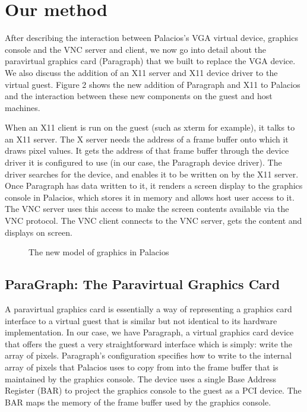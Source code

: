 \documentclass{acm_proc_article-sp}
\begin{document}
\section{Our method}
After describing the interaction between Palacios's VGA virtual device, 
graphics console and the VNC server and client, we now go into detail
about the paravirtual graphics card (Paragraph) that we built to replace the VGA 
device. We also discuss the addition of an X11 server and X11 device driver to
the virtual guest. Figure 2 shows the new addition of Paragraph and X11 to
Palacios and the interaction between these new components on the guest and host
machines. 
\par
When an X11 client is run on the guest (such as xterm for example), it talks to
an X11 server. The X server needs the address of a frame buffer onto which it
draws pixel values. It gets the address of that frame buffer through the device
driver it is configured to use (in our case, the Paragraph device driver). The 
driver searches for the device, and enables it to be written on by the X11
server.  Once Paragraph has data written to it, it renders a
screen display to the graphics console in Palacios, which stores it in memory
and allows host user access to it. The VNC server uses this access to make the 
screen contents available via the VNC protocol. The VNC client connects to the 
VNC server, gets the content and displays on screen.
\begin{figure}[h]                                              
\centering                                                     
{}                   
\caption{The new model of graphics in Palacios}   
\end{figure}                                                   
\subsection{ParaGraph: The Paravirtual Graphics Card}
A paravirtual graphics card is essentially a way of representing a graphics card
interface to a virtual guest that is similar but not identical to its hardware
implementation. In our case, we have Paragraph, a virtual graphics card device
that offers the guest a very straightforward interface which is simply: write
the array of pixels. Paragraph's configuration specifies how to write to the
internal array of pixels that Palacios uses to copy from into the frame buffer
that is maintained by the graphics console. 
The device uses a single Base Address Register (BAR) to project the graphics console to the guest as a PCI device. 
The BAR maps the memory of the frame buffer used by the graphics console. 
\end{document}
